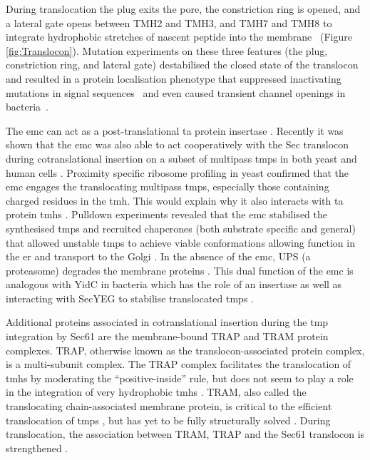 During translocation the plug exits the pore, the constriction ring is opened, and a lateral gate opens between TMH2 and TMH3, and TMH7 and TMH8 to integrate hydrophobic stretches of nascent peptide into the membrane~\cite{Berg2004, Petriman2018, Hizlan2012, Bischoff2014, Gogala2014, Egea2010, Niesen2018, VandenBerg2004} (Figure \ref{fig:Translocon}).
Mutation experiments on these three features (the plug, constriction ring, and lateral gate) destabilised the closed state of the translocon and resulted in a protein localisation phenotype that suppressed inactivating mutations in signal sequences~\cite{Emr1981, Veenendaal2004, Li2007, Junne2007} and even caused transient channel openings in bacteria~\cite{Saparov2007}.

The \gls{emc} can act as a post\--translational \gls{ta} protein insertase \cite{Guna2018a}.
Recently it was shown that the \gls{emc} was also able to act cooperatively with the Sec translocon during cotranslational insertion on a subset of multipass \gls{tmp}s in both yeast and human cells \cite{Shurtleff2018}.
Proximity specific ribosome profiling in yeast confirmed that the \gls{emc} engages the translocating multipass \gls{tmp}s, especially those containing charged residues in the \gls{tmh}.
This would explain why it also interacts with \gls{ta} protein \gls{tmh}s \cite{Guna2018a, Shurtleff2018}.
Pulldown experiments revealed that the \gls{emc} stabilised the synthesised \gls{tmp}s and recruited chaperones (both substrate specific and general) that allowed unstable \gls{tmp}s to achieve viable conformations allowing function in the \gls{er} and transport to the Golgi \cite{Shurtleff2018}.
In the absence of the \gls{emc}, UPS (a proteasome) degrades the membrane proteins \cite{Shurtleff2018}.
This dual function of the \gls{emc} is analogous with YidC \cite{Shurtleff2018} in bacteria which has the role of an insertase \cite{Samuelson2000, Drew2003, Dalbey2014} as well as interacting with SecYEG to stabilise translocated \gls{tmp}s \cite{Nagamori2004}.

Additional proteins associated in cotranslational insertion during the \gls{tmp} integration by Sec61 are the membrane\--bound TRAP and TRAM protein complexes.
TRAP, otherwise known as the translocon\--associated protein complex, is a multi\--subunit complex.
The TRAP complex facilitates the translocation of \gls{tmh}s by moderating the ``positive\--inside'' rule, but does not seem to play a role in the integration of very hydrophobic \gls{tmh}s \cite{Sommer2013}.
TRAM, also called the translocating chain-associated membrane protein, is critical to the efficient translocation of \gls{tmp}s \cite{Voigt1996}, but has yet to be fully structurally solved \cite{Conti2015}.
During translocation, the association between TRAM, TRAP and the Sec61 translocon is strengthened \cite{Conti2015}.

